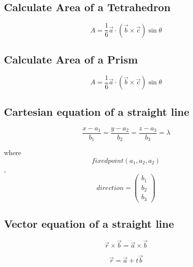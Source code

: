 \documentclass[a4paper,9pt]{scrartcl}
\begin{document}
    \subsection{Calculate Area of a Tetrahedron}
    \begin{displaymath}
        A = \frac{1}{6}\vec{a}\cdot\left( \vec{b}\times\vec{c} \right)\sin\theta
    \end{displaymath}

    \subsection{Calculate Area of a Prism}
    \begin{displaymath}
        A = \frac{1}{6}\vec{a}\cdot\left( \vec{b}\times\vec{c} \right)\sin\theta
    \end{displaymath}

    \subsection{Cartesian equation of a straight line}
    \begin{displaymath}
        \frac{x - a_1}{b_1} = \frac{y - a_2}{b_2} = \frac{z - a_3}{b_3} = \lambda
    \end{displaymath}

    where \begin{displaymath}
              fixed point (a_1, a_2, a_2)
    \end{displaymath},
    \begin{displaymath}
        direction = \begin{pmatrix}
                        b_1 \\ b_2 \\ b_3
        \end{pmatrix}
    \end{displaymath}

    \subsection{Vector equation of a straight line}
    \begin{displaymath}
        \vec{r}\times\vec{b} = \vec{a} \times \vec{b}
    \end{displaymath}

    \begin{displaymath}
        \vec{r} = \vec{a} + t\vec{b}
    \end{displaymath}
\end{document}

